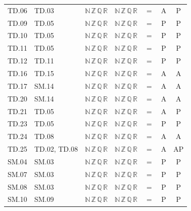 {\begin{longtable}{l l l l c c c}
TD.06 & TD.03 & $\mathbb N\,\mathbb Z\,\mathbb Q\,\mathbb R$ & $\mathbb N\,\mathbb Z\,\mathbb Q\,\mathbb R$ & $=$ & A & P \\
TD.09 & TD.05 & $\mathbb N\,\mathbb Z\,\mathbb Q\,\mathbb R$ & $\mathbb N\,\mathbb Z\,\mathbb Q\,\mathbb R$ & $=$ & P & P \\
TD.10 & TD.05 & $\mathbb N\,\mathbb Z\,\mathbb Q\,\mathbb R$ & $\mathbb N\,\mathbb Z\,\mathbb Q\,\mathbb R$ & $=$ & P & P \\
TD.11 & TD.05 & $\mathbb N\,\mathbb Z\,\mathbb Q\,\mathbb R$ & $\mathbb N\,\mathbb Z\,\mathbb Q\,\mathbb R$ & $=$ & P & P \\
TD.12 & TD.11 & $\mathbb N\,\mathbb Z\,\mathbb Q\,\mathbb R$ & $\mathbb N\,\mathbb Z\,\mathbb Q\,\mathbb R$ & $=$ & P & P \\
TD.16 & TD.15 & $\mathbb N\,\mathbb Z\,\mathbb Q\,\mathbb R$ & $\mathbb N\,\mathbb Z\,\mathbb Q\,\mathbb R$ & $=$ & A & A \\
TD.17 & SM.14 & $\mathbb N\,\mathbb Z\,\mathbb Q\,\mathbb R$ & $\mathbb N\,\mathbb Z\,\mathbb Q\,\mathbb R$ & $=$ & A & A \\
TD.20 & SM.14 & $\mathbb N\,\mathbb Z\,\mathbb Q\,\mathbb R$ & $\mathbb N\,\mathbb Z\,\mathbb Q\,\mathbb R$ & $=$ & A & A \\
TD.21 & TD.05 & $\mathbb N\,\mathbb Z\,\mathbb Q\,\mathbb R$ & $\mathbb N\,\mathbb Z\,\mathbb Q\,\mathbb R$ & $=$ & A & P \\
TD.23 & TD.05 & $\mathbb N\,\mathbb Z\,\mathbb Q\,\mathbb R$ & $\mathbb N\,\mathbb Z\,\mathbb Q\,\mathbb R$ & $=$ & P & P \\
TD.24 & TD.08 & $\mathbb N\,\mathbb Z\,\mathbb Q\,\mathbb R$ & $\mathbb N\,\mathbb Z\,\mathbb Q\,\mathbb R$ & $=$ & A & A \\
TD.25 & TD.02, TD.08 & $\mathbb N\,\mathbb Z\,\mathbb Q\,\mathbb R$ & $\mathbb N\,\mathbb Z\,\mathbb Q\,\mathbb R$ & $=$ & A & AP \\
SM.04 & SM.03 & $\mathbb N\,\mathbb Z\,\mathbb Q\,\mathbb R$ & $\mathbb N\,\mathbb Z\,\mathbb Q\,\mathbb R$ & $=$ & P & P \\
SM.07 & SM.03 & $\mathbb N\,\mathbb Z\,\mathbb Q\,\mathbb R$ & $\mathbb N\,\mathbb Z\,\mathbb Q\,\mathbb R$ & $=$ & P & P \\
SM.08 & SM.03 & $\mathbb N\,\mathbb Z\,\mathbb Q\,\mathbb R$ & $\mathbb N\,\mathbb Z\,\mathbb Q\,\mathbb R$ & $=$ & P & P \\
SM.10 & SM.09 & $\mathbb N\,\mathbb Z\,\mathbb Q\,\mathbb R$ & $\mathbb N\,\mathbb Z\,\mathbb Q\,\mathbb R$ & $=$ & P & P \\

\end{longtable}}
